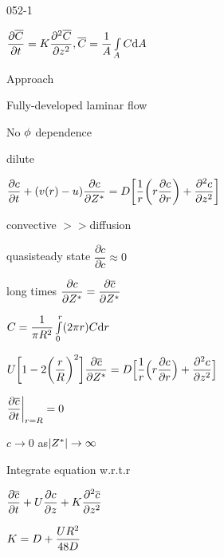 \begin{mitframe}{052-1}
\begin{listone}
\item $\dfrac{\partial\overline{\conc}}{\partial{t}}=\dilfac\dfrac{\partial^2\overline\conc}{\partial{z}^2}, \overline{
\conc}=\dfrac{1}{\helmholtz}\int\limits_{\helmholtz}\conc\mathrm{d}\helmholtz$
\item Approach
		\begin{listtwo}
        		\item Fully-developed laminar flow
                \item No $\eleccoeff$ dependence
                \item dilute
                \item $\dfrac{\partial{c}}{\partial{t}}+(\vvel(\pos)-\forcepot)\dfrac{\partial{c}}{\partial\configint}=\elecdisplace\bigg[\dfrac{1}{\pos}\bigg(\pos\dfrac{\partial {c}}{\partial\pos}\bigg)+\dfrac{\partial^2{c}}{\partial{z}^2}\bigg]$
                
                \item convective $>>$diffusion
                \item quasisteady state $\dfrac{\partial{c}}{\partial{c}}\approx0$
               \item long times $\dfrac{\partial{c}}{\partial\configint}=\dfrac{\partial\overline{c}}{\partial\configint}$
                \item $\conc=\dfrac{1}{\pi\gasconst^2}\int\limits_{0}^{\pos}(2\pi\pos)\conc\mathrm{d}\pos$
                \item $\uvel\bigg[1-2\bigg(\dfrac{\pos}{\gasconst}\bigg)^2\bigg]\dfrac{\partial\overline{c}}{\partial\configint}=\elecdisplace\Big[\dfrac{1}{\pos}\Big(\pos\dfrac{\partial{c}}{\partial\pos}\Big)+\dfrac{\partial^2{c}}{\partial{z}^2}\Big]$\item $\dfrac{\partial\overline{c}}{\partial{t}}\bigg|_{\pos=\gasconst}=0$
                \item $c\rightarrow0$ as$|\configint|\rightarrow\infty$
                \item Integrate equation w.r.t.r
                
                \item $\dfrac{\partial\overline{c}}{\partial{t}}+\uvel\dfrac{\partial{c}}{\partial{z}}+\taylordisp\dfrac{\partial^2\overline{c}}{\partial{z}^2}$
                
                \item $\taylordisp=\elecdisplace+\dfrac{\uvel\gasconst^2}{48\elecdisplace}$
             
       
        \end{listtwo}
\end{listone}

\end{mitframe}